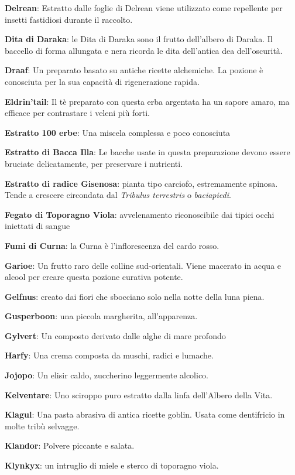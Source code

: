 \begin{multicols}{2}
\textbf{Delrean}: Estratto dalle foglie di Delrean viene utilizzato come repellente per insetti fastidiosi durante il raccolto.

\textbf{Dita di Daraka}: le Dita di Daraka sono il frutto dell'albero di Daraka. Il baccello di forma allungata e nera ricorda le dita dell'antica dea dell'oscurità.

\textbf{Draaf}: Un preparato basato su antiche ricette alchemiche. La pozione è conosciuta per la sua capacità di rigenerazione rapida.

\textbf{Eldrin'tail}: Il tè preparato con questa erba argentata ha un sapore amaro, ma efficace per contrastare i veleni più forti.

\textbf{Estratto 100 erbe}: Una miscela complessa e poco conosciuta

\textbf{Estratto di Bacca Illa}: Le bacche usate in questa preparazione devono essere bruciate delicatamente, per preservare i nutrienti.

\textbf{Estratto di radice Gisenosa}: pianta tipo carciofo, estremamente spinosa. Tende a crescere circondata dal \emph{Tribulus terrestris} o \emph{baciapiedi}.

\textbf{Fegato di Toporagno Viola}: avvelenamento riconoscibile dai tipici occhi iniettati di sangue

\textbf{Fumi di Curna}: la Curna è l'inflorescenza del cardo rosso.

\textbf{Garioe}: Un frutto raro delle colline sud-orientali. Viene macerato in acqua e alcool per creare questa pozione curativa potente.

\textbf{Gelfnus}: creato dai fiori che sbocciano solo nella notte della luna piena.

\textbf{Gusperboon}: una piccola margherita, all'apparenza.

\textbf{Gylvert}: Un composto derivato dalle alghe di mare profondo

\textbf{Harfy}: Una crema composta da muschi, radici e lumache.

\textbf{Jojopo}: Un elisir caldo, zuccherino leggermente alcolico.

\textbf{Kelventare}: Uno sciroppo puro estratto dalla linfa dell’Albero della Vita.

\textbf{Klagul}: Una pasta abrasiva di antica ricette goblin. Usata come dentifricio in molte tribù selvagge.

\textbf{Klandor}: Polvere piccante e salata.

\textbf{Klynkyx}: un intruglio di miele e sterco di toporagno viola.


\end{multicols}
